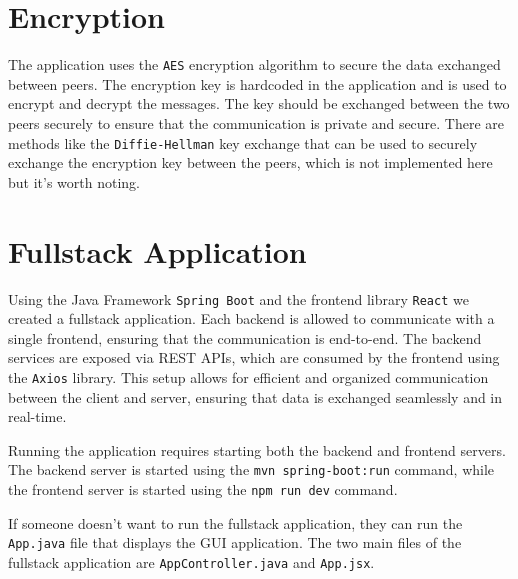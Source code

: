 \documentclass{article}
\begin{document}
\section{Encryption}
The application uses the \texttt{AES} encryption algorithm to secure the data exchanged between peers. The encryption key is hardcoded
in the application and is used to encrypt and decrypt the messages. The key should be exchanged between the two peers securely to ensure
that the communication is private and secure. There are methods like the \texttt{Diffie-Hellman} key exchange that can be used to securely
exchange the encryption key between the peers, which is not implemented here but it's worth noting.

\section{Fullstack Application}
Using the Java Framework \texttt{Spring Boot} and the frontend library \texttt{React} we created a fullstack application.
Each backend is allowed to communicate with a single frontend, ensuring that the communication is end-to-end.
The backend services are exposed via REST APIs, which are consumed by the frontend using the \texttt{Axios} library. 
This setup allows for efficient and organized communication between the client and server, ensuring that data is 
exchanged seamlessly and in real-time.

Running the application requires starting both the backend and frontend servers. The backend server is started using the
\texttt{mvn spring-boot:run} command, while the frontend server is started using the \texttt{npm run dev} command.

If someone doesn't want to run the fullstack application, they can run the \texttt{App.java} file that displays the GUI application.
The two main files of the fullstack application are \texttt{AppController.java} and \texttt{App.jsx}.
\end{document}
